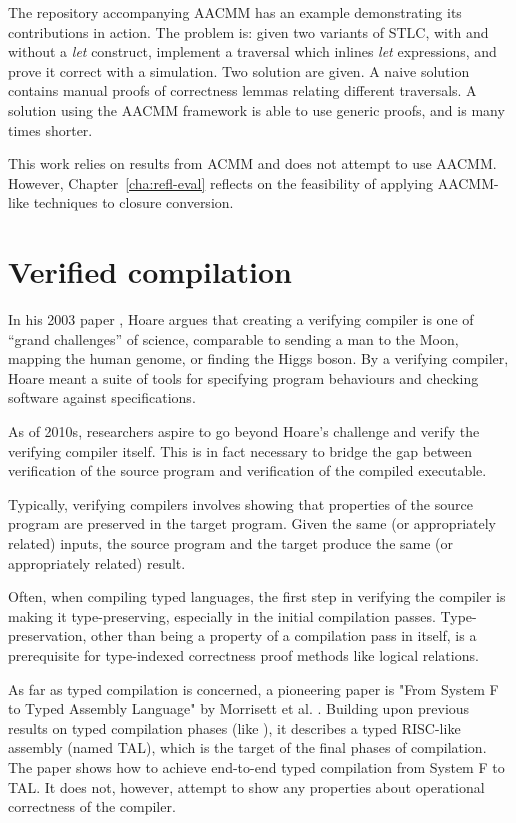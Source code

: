 \documentclass[bsc,frontabs,oneside,singlespacing,parskip,deptreport]{infthesis}
\theoremstyle{definition}
\theoremstyle{lemma}
\begin{document}
The repository accompanying AACMM has an example demonstrating its
contributions in action. The problem is: given two variants of STLC,
with and without a \textit{let} construct, implement a traversal which
inlines \textit{let} expressions, and prove it correct with a
simulation. Two solution are given. A naive solution contains manual
proofs of correctness lemmas relating different traversals. A solution
using the AACMM framework is able to use generic proofs, and is many
times shorter.

This work relies on results from ACMM and does not attempt to use
AACMM. However, Chapter~\ref{cha:refl-eval} reflects on the
feasibility of applying AACMM-like techniques to closure conversion.

\section{Verified compilation}
\label{sec:verified-compilation}

In his 2003 paper \cite{hoare2003verifying}, Hoare argues that
creating a verifying compiler is one of ``grand challenges'' of
science, comparable to sending a man to the Moon, mapping the human
genome, or finding the Higgs boson. By a verifying compiler, Hoare
meant a suite of tools for specifying program behaviours and checking
software against specifications.

As of 2010s, researchers aspire to go beyond Hoare's challenge and
verify the verifying compiler itself. This is in fact necessary to
bridge the gap between verification of the source program and
verification of the compiled executable.

Typically, verifying compilers involves showing that properties of the
source program are preserved in the target program. Given the same (or
appropriately related) inputs, the source program and the target
produce the same (or appropriately related) result.

Often, when compiling typed languages, the first step in verifying the
compiler is making it type-preserving, especially in the initial
compilation passes. Type-preservation, other than being a property of
a compilation pass in itself, is a prerequisite for type-indexed
correctness proof methods like logical relations.

As far as typed compilation is concerned, a pioneering paper is "From
System F to Typed Assembly Language" by Morrisett et
al. \cite{DBLP:conf/popl/MorrisettWCG98}. Building upon previous
results on typed compilation phases (like
\cite{DBLP:conf/popl/MinamideMH96}), it describes a typed RISC-like
assembly (named TAL), which is the target of the final phases of
compilation. The paper shows how to achieve end-to-end typed
compilation from System F to TAL. It does not, however, attempt to
show any properties about operational correctness of the compiler.
\end{document}
